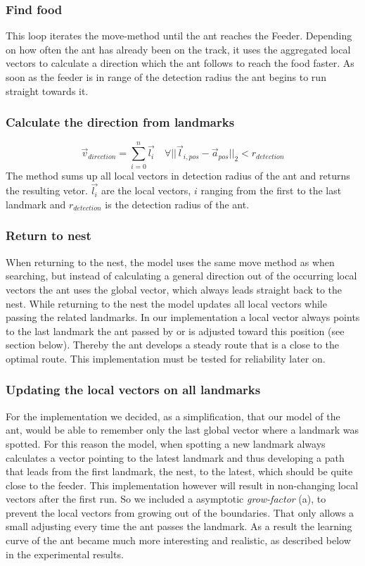 \documentclass[11pt]{article}
\begin{document}
\subsubsection{Find food} This loop iterates the move-method until the ant reaches the Feeder. Depending on how often the ant has already been on the track, it uses the aggregated local vectors to calculate a direction which the ant follows to reach the food faster. As soon as the feeder is in range of the detection radius the ant begins to run straight towards it.

\subsubsection{Calculate the direction from landmarks}
\begin{equation}
   \vec{v}_{direction} = \sum_{i=0}^{n}\vec{l_i} \quad \forall ||\vec{l}_{i, pos}-\vec{a}_{pos}||_2 < r_{detection}
\end{equation}
The method sums up all local vectors in detection radius of the ant and returns the resulting vetor. $\vec{l_i}$ are the local vectors, $i$ ranging from the first to the last landmark and $r_{detection}$ is the detection radius of the ant.

\subsubsection{Return to nest}
When returning to the nest, the model uses the same move method as when searching, but instead of calculating a general direction out of the occurring local vectors the ant uses the global vector, which always leads straight back to the nest. While returning to the nest the model updates all local vectors while passing the related landmarks. In our implementation a local vector always points to the last landmark the ant passed by or is adjusted toward this position (see section below). Thereby the ant develops a steady route that is a close to the optimal route. This implementation must be tested for reliability later on.

\subsubsection{Updating the local vectors on all landmarks}

For the implementation we decided, as a simplification, that our model of the ant, would be able to remember only the last global vector where a landmark was spotted. For this reason the model, when spotting a new landmark always calculates a vector pointing to the latest landmark and thus developing a path that leads from the first landmark, the nest, to the latest, which should be quite close to the feeder. This implementation however will result in non-changing local vectors after the first run. So we included a asymptotic \textit{grow-factor} (a), to prevent the local vectors from growing out of the boundaries. That only allows a small adjusting every time the ant passes the landmark. As a result the learning curve of the ant became much more interesting and realistic, as described below in the experimental results.
\end{document}
